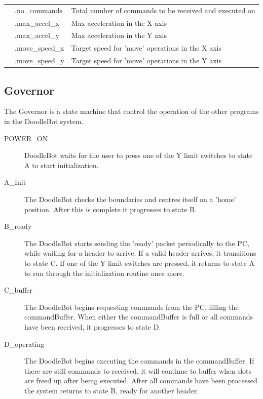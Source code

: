 \begin{center}
\begin{tabular}{|l|l|p{10cm}|}
					 & .no\_commands & Total number of commands to be received and executed on\\ \cline{2-3}
					 & .max\_accel\_x & Max acceleration in the X axis\\ \cline{2-3}
					 &  .max\_accel\_y & Max acceleration in the Y axis\\ \cline{2-3}
					 & .move\_speed\_x & Target speed for 'move' operations in the X axis\\ \cline{2-3}
					 & .move\_speed\_y & Target speed for 'move' operations in the Y axis\\ \hline
			\end{tabular}
			\label{table:globalvariables}
		\end{center}

	\subsection{Governor}
		
		The Governor is a state machine that control the operation of the other programs in the DoodleBot system.
		
		\begin{description}
			\item[POWER\_ON] DoodleBot waits for the user to press one of the Y limit switches to state A to start initialization.
			\item[A\_Init] The DoodleBot checks the boundaries and centres itself on a 'home' position. After this is complete it progresses to state B.
			\item[B\_ready] The DoodleBot starts sending the 'ready' packet periodically to the PC, while waiting for a header to arrive. If a valid header arrives, it transitions to state C. If one of the Y limit switches are pressed, it returns to state A to run through the initialization routine once more.
			\item[C\_buffer] The DoodleBot begins requesting commands from the PC, filling the commandBuffer. When either the commandBuffer is full or all commands have been received, it progresses to state D.
			\item[D\_operating] The DoodleBot begins executing the commands in the commandBuffer. If there are still commands to received, it will continue to buffer when slots are freed up after being executed. After all commands have been processed the system returns to state B, ready for another header.
		\end{description}
		
